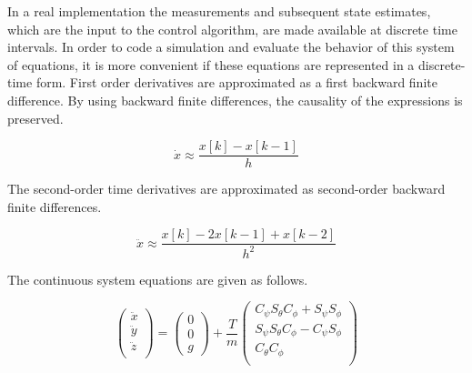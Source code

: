 In a real implementation the measurements and subsequent state estimates, which are the input to the control algorithm, are made available at discrete time intervals. In order to code a simulation and evaluate the behavior of this system of equations, it is more convenient if these equations are represented in a discrete-time form. First order derivatives are approximated as a first backward finite difference. By using backward finite differences, the causality of the expressions is preserved.

\begin{equation}
\dot x \approx \frac{x[k] - x[k-1]}{h}
\end{equation}

The second-order time derivatives are approximated as second-order backward finite differences.

\begin{equation}
\ddot x \approx \frac{x[k] -2 x[k-1] + x[k-2]}{h^2}
\end{equation}

The continuous system equations are given as follows.

\begin{equation}
    \left(
        \begin{array}{c}
           \ddot{x}\\
           \ddot{y}\\
           \ddot{z}\\
        \end{array}
    \right)
    = \left(
       \begin{array}{c}
        0\\
        0\\
        g
      \end{array}
    \right)
    +\frac{T}{m}
     \left(
        \begin{array}{c}
             C_{\psi}S_{\theta}C_{\phi} + S_{\psi}S_{\phi} \\
             S_{\psi}S_{\theta}C_{\phi} - C_{\psi}S_{\phi} \\
             C_{\theta} C_{\phi} \\
        \end{array}
    \right)
\end{equation}

